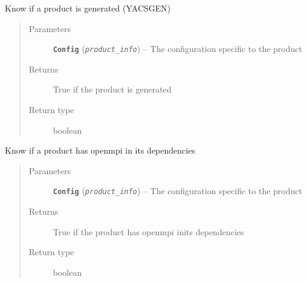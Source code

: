 \documentclass[a4paper,10pt,english]{sphinxmanual}
\begin{document}
\begin{fulllineitems}
\label{commands/apidoc/src:src.product.product_is_generated}
Know if a product is generated (YACSGEN)
\begin{quote}\begin{description}
\item[{Parameters}] \leavevmode
\textbf{\texttt{Config}} (\emph{\texttt{product\_info}}) -- The configuration specific to 
the product

\item[{Returns}] \leavevmode
True if the product is generated

\item[{Return type}] \leavevmode
boolean

\end{description}\end{quote}

\end{fulllineitems}


\begin{fulllineitems}
\label{commands/apidoc/src:src.product.product_is_mpi}
Know if a product has openmpi in its dependencies
\begin{quote}\begin{description}
\item[{Parameters}] \leavevmode
\textbf{\texttt{Config}} (\emph{\texttt{product\_info}}) -- The configuration specific to 
the product

\item[{Returns}] \leavevmode
True if the product has openmpi inits dependencies

\item[{Return type}] \leavevmode
boolean

\end{description}\end{quote}

\end{fulllineitems}

\end{document}
